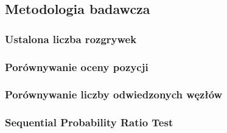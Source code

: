 \subsection{Metodologia badawcza}
\label{subsec:metodologia-badawcza}

\subsubsection{Ustalona liczba rozgrywek}
\subsubsection{Porównywanie oceny pozycji}
\subsubsection{Porównywanie liczby odwiedzonych węzłów}
\subsubsection{Sequential Probability Ratio Test}
